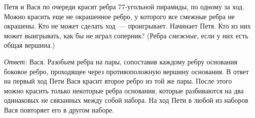 \problem
Петя и Вася по очереди красят ребра 77-угольной пирамиды, по одному за ход.
Можно красить еще не окрашенное ребро, у которого все смежные ребра не
окрашены.
Кто не может сделать ход~--- проигрывает.
Начинает Петя.
Кто из них может выигрывать, как бы не играл соперник?
(Ребра \emph{смежные}, если у них есть общая вершина.)

\solution
\emph{Ответ:} Вася.
Разобьем ребра на пары, сопоставив каждому ребру основания боковое ребро,
проходящее через противоположную вершину основания.
В ответ на первый ход Пети Вася красит второе ребро из той же пары.
После этого можно красить только некоторые ребра основания, которые разбиваются
на два одинаковых не связанных между собой набора.
На ход Пети в любой из наборов Вася повторяет его в другом наборе.  
\endproblem
